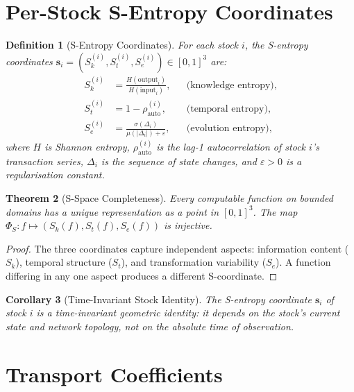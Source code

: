 \documentclass[twocolumn,10pt]{article}
\newtheorem{theorem}{Theorem}[section]
\newtheorem{definition}[theorem]{Definition}
\newtheorem{corollary}[theorem]{Corollary}
\theoremstyle{remark}
\newcommand{\Sk}{S_k}
\newcommand{\St}{S_t}
\newcommand{\Se}{S_e}
\begin{document}
\section{Per-Stock S-Entropy Coordinates}
\label{sec:sentropy}

\begin{definition}[S-Entropy Coordinates]
\label{def:sentropy_stock}
For each stock $i$, the \emph{S-entropy coordinates} $\mathbf{s}_i = (\Sk^{(i)}, \St^{(i)}, \Se^{(i)}) \in [0,1]^3$ are:
\begin{align}
    \Sk^{(i)} &= \frac{H(\text{output}_i)}{H(\text{input}_i)}, & & \text{(knowledge entropy)}, \\
    \St^{(i)} &= 1 - \rho_{\mathrm{auto}}^{(i)}, & & \text{(temporal entropy)}, \\
    \Se^{(i)} &= \frac{\sigma(\Delta_i)}{\mu(|\Delta_i|) + \varepsilon}, & & \text{(evolution entropy)},
\end{align}
where $H$ is Shannon entropy, $\rho_{\mathrm{auto}}^{(i)}$ is the lag-1 autocorrelation of stock $i$'s transaction series, $\Delta_i$ is the sequence of state changes, and $\varepsilon > 0$ is a regularisation constant.
\end{definition}

\begin{theorem}[S-Space Completeness]
\label{thm:sspace_complete}
Every computable function on bounded domains has a unique representation as a point in $[0,1]^3$.  The map $\Phi_S : f \mapsto (\Sk(f), \St(f), \Se(f))$ is injective.
\end{theorem}

\begin{proof}
The three coordinates capture independent aspects: information content ($\Sk$), temporal structure ($\St$), and transformation variability ($\Se$).  A function differing in any one aspect produces a different S-coordinate.
\end{proof}

\begin{corollary}[Time-Invariant Stock Identity]
\label{cor:time_invariant_id}
The S-entropy coordinate $\mathbf{s}_i$ of stock $i$ is a time-invariant geometric identity: it depends on the stock's current state and network topology, not on the absolute time of observation.
\end{corollary}


\section{Transport Coefficients}
\label{sec:transport}
\end{document}
